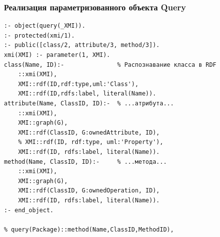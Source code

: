 \documentclass[10pt]{beamer}
\begin{document}
\begin{frame}[fragile]
  \frametitle{Реализация параметризованного объекта Query}
\begin{verbatim}
:- object(query(_XMI)).
:- protected(xmi/1).
:- public([class/2, attribute/3, method/3]).
xmi(XMI) :- parameter(1, XMI).
class(Name, ID):-               % Распознавание класса в RDF
    ::xmi(XMI),
    XMI::rdf(ID,rdf:type,uml:'Class'),
    XMI::rdf(ID,rdfs:label, literal(Name)).
attribute(Name, ClassID, ID):-  % ...атрибута...
    ::xmi(XMI),
    XMI::graph(G),
    XMI::rdf(ClassID, G:ownedAttribute, ID),
    % XMI::rdf(ID, rdf:type, uml:'Property'),
    XMI::rdf(ID, rdfs:label, literal(Name)).
method(Name, ClassID, ID):-     % ...метода...
    ::xmi(XMI),
    XMI::graph(G),
    XMI::rdf(ClassID, G:ownedOperation, ID),
    XMI::rdf(ID, rdfs:label, literal(Name)).
:- end_object.

% query(Package)::method(Name,ClassID,MethodID),
\end{verbatim}
\end{frame}
\end{document}

